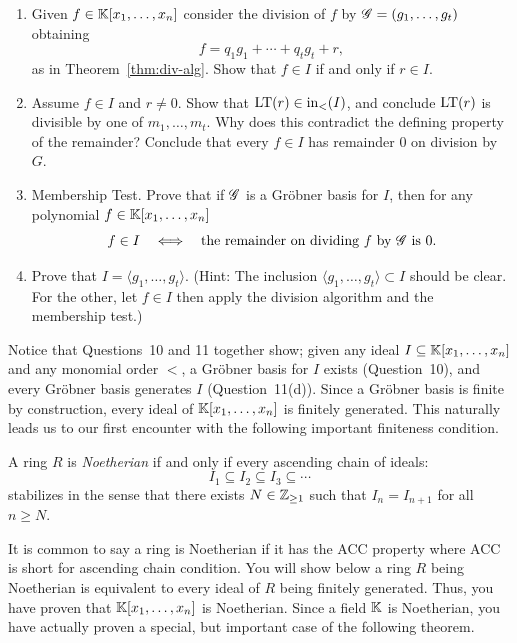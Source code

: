 \documentclass[12pt,reqno]{amsart}
\begin{document}
\begin{enumerate}[leftmargin=*]
\begin{enumerate}[label=(\alph*),ref=\theenumi\alph*]
    \item Given $f \in \mathbb{K}[x_1,\ldots,x_n]$ consider the division of $f$ by $\mathcal{G}=(g_1,\ldots,g_t)$ obtaining
     \[
    f=q_1g_1+\cdots+q_tg_t+r,
    \]
    as in Theorem~\ref{thm:div-alg}. Show that $f\in I$ if and only if $r\in I$.
    
    \item Assume $f\in I$ and $r\neq 0$. Show that $\operatorname{LT}(r)\in \operatorname{in}_{<}(I)$, and conclude $\operatorname{LT}(r)$ is divisible by one of $m_1,\ldots,m_t$. Why does this contradict the defining property of the remainder? Conclude that every $f\in I$ has remainder $0$ on division by $G$.
    
	\item Membership Test. Prove that if $\mathcal{G}$ is a Gr\"obner basis for $I$, then for any polynomial $f \in \mathbb{K}[x_1,\ldots,x_n]$
	\[
	f\in I \quad \Longleftrightarrow \quad \text{the remainder on dividing $f$ by $\mathcal{G}$ is $0$}.
	\]
 
    \item Prove that $I = \langle g_1,\ldots,g_t\rangle$. (Hint: The inclusion $\langle g_1,\ldots,g_t\rangle \subset I$ should be clear. For the other, let $f\in I$ then apply the division algorithm and the membership test.)
\end{enumerate}
\end{enumerate}

\hrulefill

Notice that Questions~10 and 11 together show; given any ideal $I \subseteq \mathbb{K}[x_1,\ldots,x_n]$ and any monomial order $<$, a Gr\"obner basis for $I$ exists (Question~10), and every Gr\"obner basis generates $I$ (Question~11(d)). Since a Gr\"obner basis is finite by construction, every ideal of $\mathbb{K}[x_1,\ldots,x_n]$ is finitely generated. This naturally leads us to our first encounter with the following important finiteness condition. 

\begin{definition}
	A ring $R$ is \emph{Noetherian} if and only if every ascending chain of ideals: 
	\[
	 I_1\subseteq I_2\subseteq I_3\subseteq \cdots
	\]
	stabilizes in the sense that there exists $N\in \mathbb{Z}_{\geq1}$ such that $I_{n}=I_{n+1}$ for all $n\geq N$. 
\end{definition}

It is common to say a ring is Noetherian if it has the ACC property where ACC is short for ascending chain condition. You will show below a ring $R$ being Noetherian is equivalent to every ideal of $R$ being finitely generated. Thus, you have proven that $\mathbb{K}[x_1,\ldots,x_n]$ is Noetherian. Since a field $\mathbb{K}$ is Noetherian, you have actually proven a special, but important case of the following theorem. 
\end{document}
